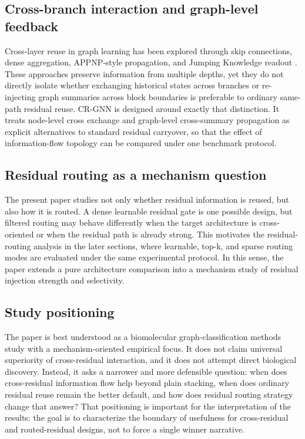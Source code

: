 \subsection*{Cross-branch interaction and graph-level feedback}

Cross-layer reuse in graph learning has been explored through skip connections, dense aggregation, APPNP-style propagation, and Jumping Knowledge readout \cite{xu2018representation,klicpera2018combining,gao2019graph}. These approaches preserve information from multiple depths, yet they do not directly isolate whether exchanging historical states across branches or re-injecting graph summaries across block boundaries is preferable to ordinary same-path residual reuse. CR-GNN is designed around exactly that distinction. It treats node-level cross exchange and graph-level cross-summary propagation as explicit alternatives to standard residual carryover, so that the effect of information-flow topology can be compared under one benchmark protocol.

\subsection*{Residual routing as a mechanism question}

The present paper studies not only whether residual information is reused, but also how it is routed. A dense learnable residual gate is one possible design, but filtered routing may behave differently when the target architecture is cross-oriented or when the residual path is already strong. This motivates the residual-routing analysis in the later sections, where learnable, top-k, and sparse routing modes are evaluated under the same experimental protocol. In this sense, the paper extends a pure architecture comparison into a mechanism study of residual injection strength and selectivity.

\subsection*{Study positioning}

The paper is best understood as a biomolecular graph-classification methods study with a mechanism-oriented empirical focus. It does not claim universal superiority of cross-residual interaction, and it does not attempt direct biological discovery. Instead, it asks a narrower and more defensible question: when does cross-residual information flow help beyond plain stacking, when does ordinary residual reuse remain the better default, and how does residual routing strategy change that answer? That positioning is important for the interpretation of the results: the goal is to characterize the boundary of usefulness for cross-residual and routed-residual designs, not to force a single winner narrative.
